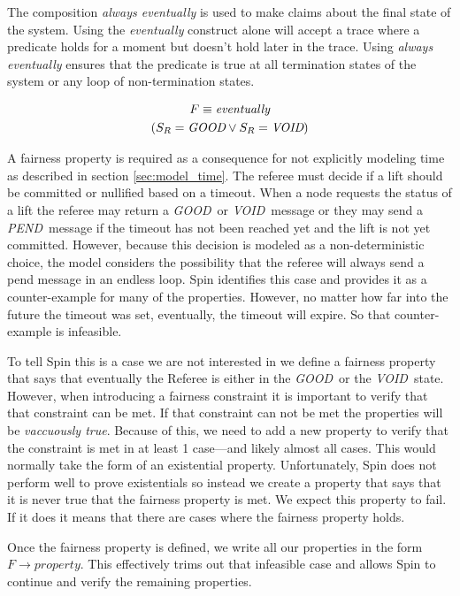 \documentclass[runningheads]{llncs}
\newcommand{\refstate}{S_R}
\newcommand{\pend}{\emph{PEND}}
\newcommand{\void}{\emph{VOID}}
\newcommand{\good}{\emph{GOOD}}
\newcommand{\eventually}{\emph{eventually}}
\begin{document}
The composition \emph{always eventually} is used to make claims about the final state of the system. Using the \emph{eventually} construct alone will accept a trace where a predicate holds for a moment but doesn't hold later in the trace. Using \emph{always eventually} ensures that the predicate is true at all termination states of the system or any loop of non-termination states. 

\begin{definition}
\begin{multline*}
    F \equiv \eventually \\
     (\refstate = \good \vee \refstate = \void) \\
\end{multline*}
\end{definition}
A fairness property is required as a consequence for not explicitly modeling time as described in section \ref{sec:model_time}. The referee must decide if a lift should be committed or nullified based on a timeout. When a node requests the status of a lift the referee may return a \good\ or \void\ message or they may send a \pend\ message if the timeout has not been reached yet and the lift is not yet committed. However, because this decision is modeled as a non-deterministic choice, the model considers the possibility that the referee will always send a pend message in an endless loop. Spin identifies this case and provides it as a counter-example for many of the properties. However, no matter how far into the future the timeout was set, eventually, the timeout will expire. So that counter-example is infeasible.

To tell Spin this is a case we are not interested in we define a fairness property that says that eventually the Referee is either in the \good\ or the \void\ state. However, when introducing a fairness constraint it is important to verify that that constraint can be met. If that constraint can not be met the properties will be \emph{vaccuously true}. Because of this, we need to add a new property to verify that the constraint is met in at least 1 case---and likely almost all cases. This would normally take the form of an existential property. Unfortunately, Spin does not perform well to prove existentials so instead we create a property that says that it is never true that the fairness property is met. We expect this property to fail. If it does it means that there are cases where the fairness property holds.

Once the fairness property is defined, we write all our properties in the form $F \longrightarrow property.$ This effectively trims out that infeasible case and allows Spin to continue and verify the remaining properties. 
\end{document}
